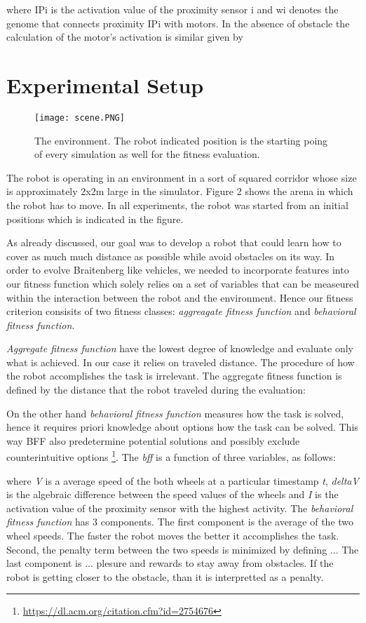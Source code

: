 \documentclass[format=acmsmall, review=false, screen=true]{acmart}
\begin{document}
where IPi is the activation value of the proximity sensor i and wi denotes the genome that connects proximity IPi with motors. In the absence of obstacle the calculation of the motor's activation is similar given by




\section{Experimental Setup}

\begin{figure}[H]
  \texttt{[image: scene.PNG]}
  \caption{The environment. The robot indicated position is the starting poing of every simulation as well for the fitness evaluation.}
  \label{fig:arena-scene}
\end{figure}

The robot is operating in an environment in a sort of squared corridor whose size is approximately 2x2m large in the simulator. Figure 2 shows the arena in which the robot has to move. In all experiments, the robot was started from an initial positions which is indicated in the figure.

As already discussed, our goal was to develop a robot that could learn how to cover as much much distance as possible while avoid obstacles on its way. In order to evolve Braitenberg like vehicles, we needed to incorporate features into our fitness function which solely relies on a set of variables that can be measeured within the interaction between the robot and the environment. Hence our fitness criterion consisits of two fitness classes: \emph{aggreagate fitness function} and \emph{behavioral fitness function}.

\emph{Aggregate fitness function} have the lowest degree of knowledge and evaluate only what is achieved. In our case it relies on traveled distance. The procedure of how the robot accomplishes the task is irrelevant. The aggregate fitness function is defined by the distance that the robot traveled during the evaluation:

On the other hand \emph{behavioral fitness function} measures how the task is solved, hence it requires priori knowledge about options how the task can be solved. This way BFF also predetermine potential solutions and possibly exclude counterintuitive options \footnote{\url{https://dl.acm.org/citation.cfm?id=2754676}}. The \emph{bff} is a function of three variables, as follows:


where \emph{V} is a average speed of the both wheels at a particular timestamp \emph{t}, \emph{deltaV} is the algebraic difference between the speed values of the wheels and \emph{I} is the activation value of the proximity sensor with the highest activity. The \emph{behavioral fitness function} has 3 components. The first component is the average of the two wheel speeds. The faster the robot moves the better it accomplishes the task. Second, the penalty term between the two speeds is minimized by defining ... The last component is ... plesure and rewards to stay away from obstacles. If the robot is getting closer to the obstacle, than it is interpretted as a penalty.
\end{document}
